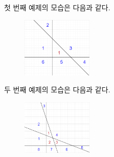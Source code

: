 \begin{problem}{\kcpcpapercuttitle}
    \Examples
    
    \begin{example}
    \end{example}
    
    \Explanation
    첫 번째 예제의 모습은 다음과 같다.
    \begin{figure}[h]
        \centering
        \includegraphics[width=0.3\textwidth]{./problems/papercut-ex1.png}
    \end{figure}
    
    두 번째 예제의 모습은 다음과 같다.
    \begin{figure}[h]
        \centering
        \includegraphics[width=0.3\textwidth]{./problems/papercut-ex2.png}
    \end{figure}
\end{problem}

